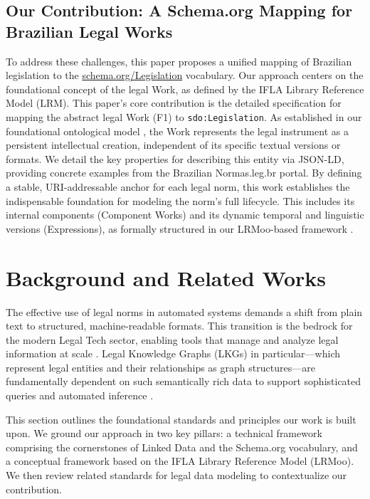 \documentclass[11pt]{article}
\begin{document}
\subsection{Our Contribution: A Schema.org Mapping for Brazilian Legal Works}
To address these challenges, this paper proposes a unified mapping of Brazilian legislation to the \url{schema.org/Legislation} vocabulary. Our approach centers on the foundational concept of the legal Work, as defined by the IFLA Library Reference Model (LRM).
This paper's core contribution is the detailed specification for mapping the abstract legal Work (F1) to \texttt{sdo:Legislation}. As established in our foundational ontological model \cite{demartim2025temporal}, the Work represents the legal instrument as a persistent intellectual creation, independent of its specific textual versions or formats. We detail the key properties for describing this entity via JSON-LD, providing concrete examples from the Brazilian Normas.leg.br portal.
By defining a stable, URI-addressable anchor for each legal norm, this work establishes the indispensable foundation for modeling the norm's full lifecycle. This includes its internal components (Component Works) and its dynamic temporal and linguistic versions (Expressions), as formally structured in our LRMoo-based framework \cite{demartim2025temporal}.

\section{Background and Related Works}
The effective use of legal norms in automated systems demands a shift from plain text to structured, machine-readable formats. This transition is the bedrock for the modern Legal Tech sector, enabling tools that manage and analyze legal information at scale  \cite{veith2016legaltech}. Legal Knowledge Graphs (LKGs) in particular—which represent legal entities and their relationships as graph structures—are fundamentally dependent on such semantically rich data to support sophisticated queries and automated inference \cite{filtz2017building, koniaris2016structuring}.

This section outlines the foundational standards and principles our work is built upon. We ground our approach in two key pillars: a technical framework comprising the cornerstones of Linked Data and the Schema.org vocabulary, and a conceptual framework based on the IFLA Library Reference Model (LRMoo). We then review related standards for legal data modeling to contextualize our contribution.
\end{document}
